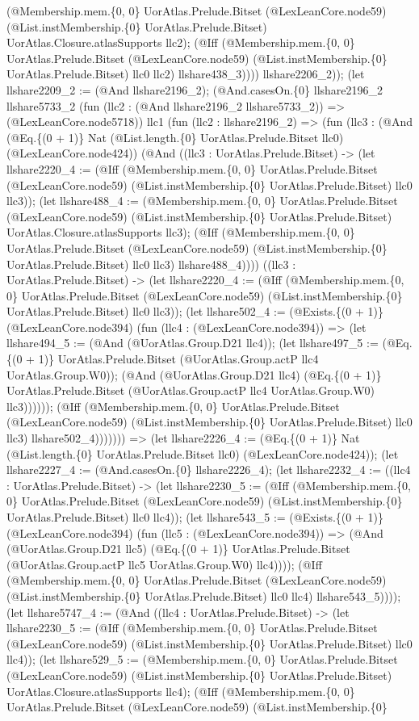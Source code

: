 \documentclass[11pt]{article}
\begin{document}
(@Membership.mem.\{0, 0\} UorAtlas.Prelude.Bitset (@LexLeanCore.node59) (@List.instMembership.\{0\} UorAtlas.Prelude.Bitset) UorAtlas.Closure.atlasSupports llc2); (@Iff (@Membership.mem.\{0, 0\} UorAtlas.Prelude.Bitset (@LexLeanCore.node59) (@List.instMembership.\{0\} UorAtlas.Prelude.Bitset) llc0 llc2) llshare438\_3)))) llshare2206\_2)); (let llshare2209\_2 := (@And llshare2196\_2); (@And.casesOn.\{0\} llshare2196\_2 llshare5733\_2 (fun (llc2 : (@And llshare2196\_2 llshare5733\_2)) => (@LexLeanCore.node5718)) llc1 (fun (llc2 : llshare2196\_2) => (fun (llc3 : (@And (@Eq.\{(0 + 1)\} Nat (@List.length.\{0\} UorAtlas.Prelude.Bitset llc0) (@LexLeanCore.node424)) (@And ((llc3 : UorAtlas.Prelude.Bitset) -> (let llshare2220\_4 := (@Iff (@Membership.mem.\{0, 0\} UorAtlas.Prelude.Bitset (@LexLeanCore.node59) (@List.instMembership.\{0\} UorAtlas.Prelude.Bitset) llc0 llc3)); (let llshare488\_4 := (@Membership.mem.\{0, 0\} UorAtlas.Prelude.Bitset (@LexLeanCore.node59) (@List.instMembership.\{0\} UorAtlas.Prelude.Bitset) UorAtlas.Closure.atlasSupports llc3); (@Iff (@Membership.mem.\{0, 0\} UorAtlas.Prelude.Bitset (@LexLeanCore.node59) (@List.instMembership.\{0\} UorAtlas.Prelude.Bitset) llc0 llc3) llshare488\_4)))) ((llc3 : UorAtlas.Prelude.Bitset) -> (let llshare2220\_4 := (@Iff (@Membership.mem.\{0, 0\} UorAtlas.Prelude.Bitset (@LexLeanCore.node59) (@List.instMembership.\{0\} UorAtlas.Prelude.Bitset) llc0 llc3)); (let llshare502\_4 := (@Exists.\{(0 + 1)\} (@LexLeanCore.node394) (fun (llc4 : (@LexLeanCore.node394)) => (let llshare494\_5 := (@And (@UorAtlas.Group.D21 llc4)); (let llshare497\_5 := (@Eq.\{(0 + 1)\} UorAtlas.Prelude.Bitset (@UorAtlas.Group.actP llc4 UorAtlas.Group.W0)); (@And (@UorAtlas.Group.D21 llc4) (@Eq.\{(0 + 1)\} UorAtlas.Prelude.Bitset (@UorAtlas.Group.actP llc4 UorAtlas.Group.W0) llc3)))))); (@Iff (@Membership.mem.\{0, 0\} UorAtlas.Prelude.Bitset (@LexLeanCore.node59) (@List.instMembership.\{0\} UorAtlas.Prelude.Bitset) llc0 llc3) llshare502\_4))))))) => (let llshare2226\_4 := (@Eq.\{(0 + 1)\} Nat (@List.length.\{0\} UorAtlas.Prelude.Bitset llc0) (@LexLeanCore.node424)); (let llshare2227\_4 := (@And.casesOn.\{0\} llshare2226\_4); (let llshare2232\_4 := ((llc4 : UorAtlas.Prelude.Bitset) -> (let llshare2230\_5 := (@Iff (@Membership.mem.\{0, 0\} UorAtlas.Prelude.Bitset (@LexLeanCore.node59) (@List.instMembership.\{0\} UorAtlas.Prelude.Bitset) llc0 llc4)); (let llshare543\_5 := (@Exists.\{(0 + 1)\} (@LexLeanCore.node394) (fun (llc5 : (@LexLeanCore.node394)) => (@And (@UorAtlas.Group.D21 llc5) (@Eq.\{(0 + 1)\} UorAtlas.Prelude.Bitset (@UorAtlas.Group.actP llc5 UorAtlas.Group.W0) llc4)))); (@Iff (@Membership.mem.\{0, 0\} UorAtlas.Prelude.Bitset (@LexLeanCore.node59) (@List.instMembership.\{0\} UorAtlas.Prelude.Bitset) llc0 llc4) llshare543\_5)))); (let llshare5747\_4 := (@And ((llc4 : UorAtlas.Prelude.Bitset) -> (let llshare2230\_5 := (@Iff (@Membership.mem.\{0, 0\} UorAtlas.Prelude.Bitset (@LexLeanCore.node59) (@List.instMembership.\{0\} UorAtlas.Prelude.Bitset) llc0 llc4)); (let llshare529\_5 := (@Membership.mem.\{0, 0\} UorAtlas.Prelude.Bitset (@LexLeanCore.node59) (@List.instMembership.\{0\} UorAtlas.Prelude.Bitset) UorAtlas.Closure.atlasSupports llc4); (@Iff (@Membership.mem.\{0, 0\} UorAtlas.Prelude.Bitset (@LexLeanCore.node59) (@List.instMembership.\{0\} 
\end{document}

